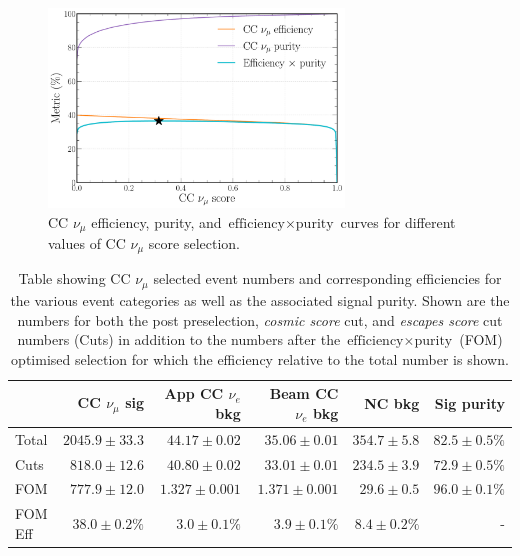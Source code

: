 \begin{figure} %
    \includegraphics[width=0.7\textwidth]{diagrams/7-results/final_numu_eff_curves.pdf}
    \caption[CC $\nu_{\mu}$ efficiency, purity, and $\text{efficiency}\times\text{purity}$ curves]
    {CC $\nu_{\mu}$ efficiency, purity, and $\text{efficiency}\times\text{purity}$ curves for
        different values of CC $\nu_{\mu}$ score selection.}
    \label{fig:final_numu_eff_curves}
\end{figure}

\begin{table}
    \begin{tabular}{lrrrrr}
                 & CC $\nu_{\mu}$ sig & App CC $\nu_{e}$ bkg & Beam CC $\nu_{e}$ bkg & NC bkg & Sig purity \\
        \midrule
        Total & $2045.9\pm33.3$ & $44.17\pm0.02$ & $35.06\pm0.01$ & $354.7\pm5.8$ & $82.5\pm0.5\%$ \\
        Cuts  & $818.0\pm12.6$  & $40.80\pm0.02$ & $33.01\pm0.01$ & $234.5\pm3.9$ & $72.9\pm0.5\%$ \\
        FOM   & $777.9\pm12.0$  & $1.327\pm0.001$ & $1.371\pm0.001$ & $29.6\pm0.5$ & $96.0\pm0.1\%$ \\
        \midrule
        FOM Eff & $38.0\pm0.2\%$ & $3.0\pm0.1\%$  & $3.9\pm0.1\%$   & $8.4\pm0.2\%$ & -              \\
    \end{tabular}
    \caption[Table showing CC $\nu_{\mu}$ selected event numbers, efficiencies and signal purity]
    {Table showing CC $\nu_{\mu}$ selected event numbers and corresponding efficiencies for the
        various event categories as well as the associated signal purity. Shown are the numbers
        for both the post preselection, \emph{cosmic score} cut, and \emph{escapes score} cut
        numbers (Cuts) in addition to the numbers after the $\text{efficiency}\times\text{purity}$
        (FOM) optimised selection for which the efficiency relative to the total number is shown.}
    \label{tab:numu_selection}
\end{table}

